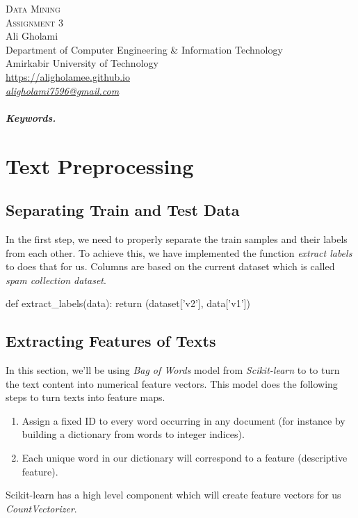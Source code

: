 \documentclass[12pt]{article}
\numberwithin{equation}{section}
\numberwithin{table}{section}
\numberwithin{figure}{section}
\begin{document}

\begin{center}
\textsc{\Huge Data Mining} \\[2pt]
	\textsc{\Large Assignment 3}\\
	\vspace{0.5cm}
  Ali Gholami \\[6pt]
  Department of Computer Engineering \& Information Technology\\
  Amirkabir University of Technology  \\[6pt]
  \def\UrlFont{\em}
  \url{https://aligholamee.github.io}\\
\href{mailto:aligholami7596@gmail.com}{\textit{aligholami7596@gmail.com}}
\end{center}

\begin{abstract}

\end{abstract} 

\subparagraph{Keywords.} \textit{}

\section{Text Preprocessing}
\subsection{Separating Train and Test Data}
In the first step, we need to properly separate the train samples and their labels from each other. To achieve this, we have implemented the function \textit{extract labels} to does that for us. Columns are based on the current dataset which is called \textit{spam collection dataset}.

\begin{python}
	def extract_labels(data):
		return (dataset['v2'], data['v1'])
\end{python}

\subsection{Extracting Features of Texts}
In this section, we'll be using \textit{Bag of Words} model from \textit{Scikit-learn} to to turn the text content into numerical feature vectors. This model does the following steps to turn texts into feature maps.
\begin{enumerate}
	\item Assign a fixed ID to every word occurring in any document (for instance by building a dictionary from words to integer indices).
	
	\item Each unique word in our dictionary will correspond to a feature (descriptive feature).
\end{enumerate}
Scikit-learn has a high level component which will create feature vectors for us \textit{CountVectorizer}.
\end{document}
